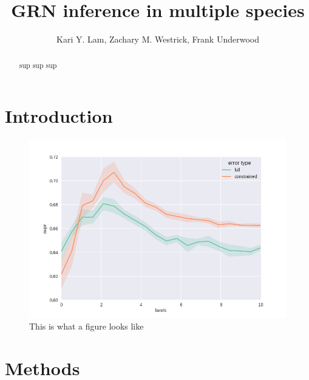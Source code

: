 \documentclass[11pt]{article}
\begin{document}
\title{GRN inference in multiple species}
\author{Kari Y. Lam, Zachary M. Westrick, Frank Underwood}
\maketitle

\begin{abstract}
sup sup sup
\end{abstract}

\section{Introduction}

\begin{figure}
\begin{center}
  \includegraphics[scale=0.45]{simulated.png}
  \caption{\label{fig:figure1} This is what a figure looks like}
  \end{center}
\end{figure}

\section{Methods}
\end{document}
